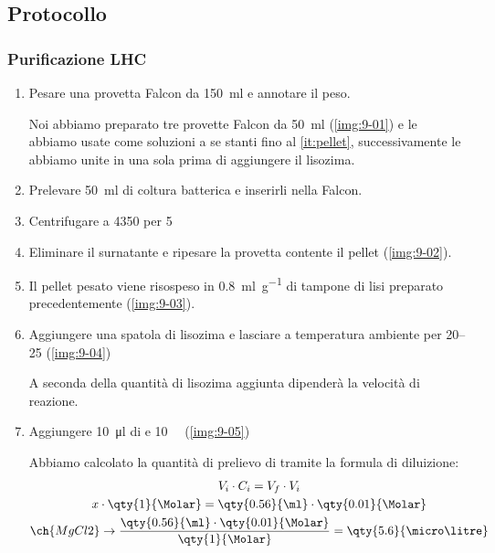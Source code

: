 \subsection{Protocollo}

\subsubsection{Purificazione LHC}
\begin{enumerate}
	\item Pesare una provetta Falcon da \qty{150}{\ml} e annotare il peso.
	      \begin{Note}
		      Noi abbiamo preparato tre provette Falcon da \qty{50}{\ml} (\autoref{img:9-01}) e le abbiamo usate come soluzioni a se stanti fino al \autoref{it:pellet}, successivamente le abbiamo unite in una sola prima di aggiungere il lisozima.
	      \end{Note}
	\item Prelevare \qty{50}{\ml} di coltura batterica e inserirli nella Falcon.
	\item Centrifugare a \qty{4350}{\giri} per \qty{5}{\min}
	\item Eliminare il surnatante e ripesare la provetta contente il pellet (\autoref{img:9-02}).
	\item \label{it:pellet} Il pellet pesato viene risospeso in \qty{0.8}{\ml\per\g} di tampone di lisi preparato precedentemente (\autoref{img:9-03}).
	\item Aggiungere una spatola di lisozima e lasciare a temperatura ambiente per \qtyrange{20}{25}{\min} (\autoref{img:9-04})
	      \begin{Informazione}
		      A seconda della quantità di lisozima aggiunta dipenderà la velocità di reazione.
	      \end{Informazione}
	\item Aggiungere \qty{10}{\micro\litre} di  e \qty{10}{\milli\Molar}  (\autoref{img:9-05})
	      \begin{myBox}
		      Abbiamo calcolato la quantità di prelievo di  tramite la formula di diluizione:
		      \begin{gather*}
			      V_i \cdot C_i = V_f \cdot V_i \\
			      x \cdot \qty{1}{\Molar}= \qty{0.56}{\ml} \cdot \qty{0.01}{\Molar}\\
			      \ch{MgCl2} \rightarrow \frac{\qty{0.56}{\ml} \cdot \qty{0.01}{\Molar}}{\qty{1}{\Molar}} = \qty{5.6}{\micro\litre}
		      \end{gather*}

\end{myBox}
\end{enumerate}
